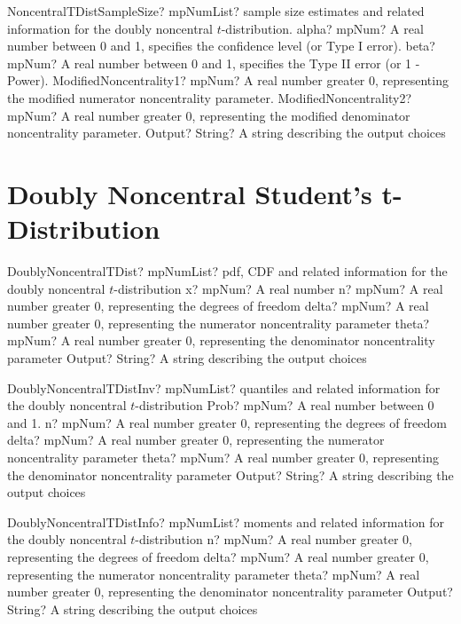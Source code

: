 \documentclass[12pt,a4paper,openany]{book}
\begin{document}
\begin{mpFunctionsExtract}
\mpFunctionFiveNotImplemented
{NoncentralTDistSampleSize? mpNumList? sample size estimates and related information for the doubly noncentral $t$-distribution.}
{alpha? mpNum? A real number between 0 and 1, specifies the confidence level (or Type I error).}
{beta? mpNum?  A real number between 0 and 1, specifies the Type II error (or 1 - Power).}
{ModifiedNoncentrality1? mpNum? A real number greater 0, representing the modified numerator noncentrality parameter.}
{ModifiedNoncentrality2? mpNum? A real number greater 0, representing the modified denominator noncentrality parameter.}
{Output? String? A string describing the output choices}
\end{mpFunctionsExtract}

\section{Doubly Noncentral Student's t-Distribution}

\begin{mpFunctionsExtract}
\mpFunctionFiveNotImplemented
{DoublyNoncentralTDist? mpNumList? pdf, CDF and related information for the doubly noncentral $t$-distribution}
{x? mpNum? A real number}
{n? mpNum? A real number greater 0, representing the degrees of freedom}
{delta? mpNum? A real number greater 0, representing the numerator noncentrality parameter}
{theta? mpNum? A real number greater 0, representing the denominator noncentrality parameter}
{Output? String? A string describing the output choices}
\end{mpFunctionsExtract}

\begin{mpFunctionsExtract}
\mpFunctionFiveNotImplemented
{DoublyNoncentralTDistInv? mpNumList? quantiles and related information for the  doubly noncentral $t$-distribution}
{Prob? mpNum? A real number between 0 and 1.}
{n? mpNum? A real number greater 0, representing the degrees of freedom}
{delta? mpNum? A real number greater 0, representing the numerator noncentrality parameter}
{theta? mpNum? A real number greater 0, representing the denominator noncentrality parameter}
{Output? String? A string describing the output choices}
\end{mpFunctionsExtract}

\begin{mpFunctionsExtract}
\mpFunctionFourNotImplemented
{DoublyNoncentralTDistInfo? mpNumList? moments and related information for the doubly noncentral $t$-distribution}
{n? mpNum? A real number greater 0, representing the degrees of freedom}
{delta? mpNum? A real number greater 0, representing the numerator noncentrality parameter}
{theta? mpNum? A real number greater 0, representing the denominator noncentrality parameter}
{Output? String? A string describing the output choices}
\end{mpFunctionsExtract}
\end{document}
